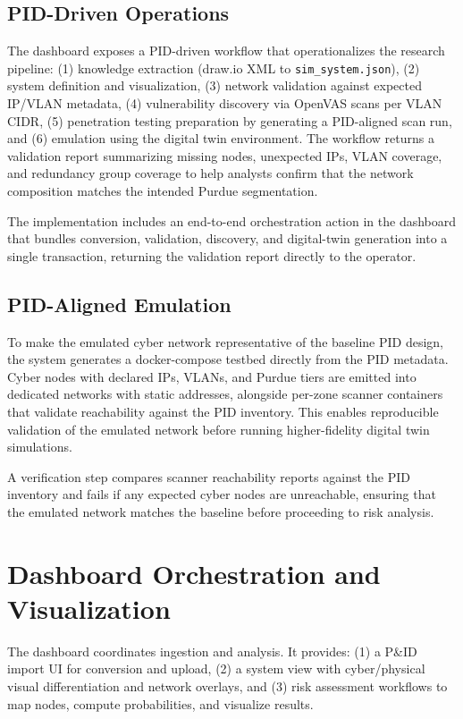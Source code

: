 \documentclass[journal]{IEEEtran}
\begin{document}
\subsection{PID-Driven Operations}
The dashboard exposes a PID-driven workflow that operationalizes the research pipeline:
(1) knowledge extraction (draw.io XML to \texttt{sim\_system.json}), (2) system definition
and visualization, (3) network validation against expected IP/VLAN metadata, (4)
vulnerability discovery via OpenVAS scans per VLAN CIDR, (5) penetration testing
preparation by generating a PID-aligned scan run, and (6) emulation using the digital
twin environment. The workflow returns a validation report summarizing missing nodes,
unexpected IPs, VLAN coverage, and redundancy group coverage to help analysts confirm
that the network composition matches the intended Purdue segmentation.

The implementation includes an end-to-end orchestration action in the dashboard that
bundles conversion, validation, discovery, and digital-twin generation into a single
transaction, returning the validation report directly to the operator.

\subsection{PID-Aligned Emulation}
To make the emulated cyber network representative of the baseline PID design, the system
generates a docker-compose testbed directly from the PID metadata. Cyber nodes with
declared IPs, VLANs, and Purdue tiers are emitted into dedicated networks with static
addresses, alongside per-zone scanner containers that validate reachability against the
PID inventory. This enables reproducible validation of the emulated network before
running higher-fidelity digital twin simulations.

A verification step compares scanner reachability reports against the PID inventory and
fails if any expected cyber nodes are unreachable, ensuring that the emulated network
matches the baseline before proceeding to risk analysis.

\section{Dashboard Orchestration and Visualization}
The dashboard coordinates ingestion and analysis. It provides:
(1) a P\&ID import UI for conversion and upload, (2) a system view with cyber/physical
visual differentiation and network overlays, and (3) risk assessment workflows to map
nodes, compute probabilities, and visualize results.
\end{document}
